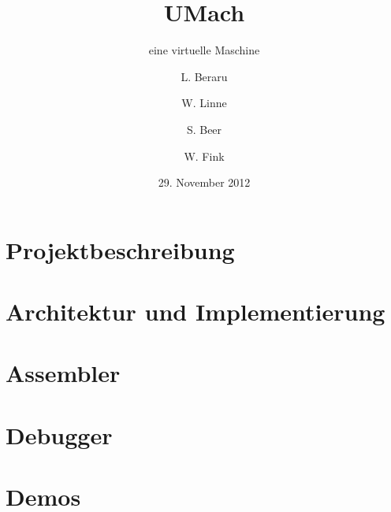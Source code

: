 \documentclass{beamer}
\title{UMach}
\subtitle{eine virtuelle Maschine}
\author{L. Beraru \and W. Linne \and S. Beer \and W. Fink}
\institute{Betreuer: Prof. Dr. Kern\\Georg-Simon-Ohm-Hochschule}
\date{29. November 2012}
\begin{document}
\frame{\titlepage}



\part{Projektbeschreibung}


\part{Architektur und Implementierung}


\part{Assembler}


\part{Debugger}


\part{Demos}

\end{document}

